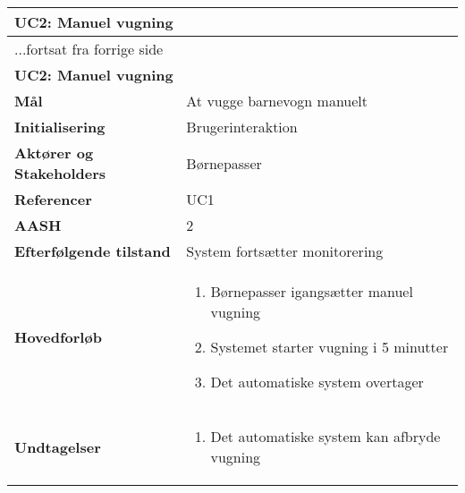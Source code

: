 \begin{center} \centering \label{kravspec:uc2}
	\begin{longtable}{|p{5cm}|p{9cm}|}  %
	\hline
		\multicolumn{2}{|l|}{\textbf{UC2: Manuel vugning}} \\\hline %
		\endfirsthead
		
		\multicolumn{2}{l}{...fortsat fra forrige side} \\ \hline %
		\multicolumn{2}{|l|}{\textbf{UC2: Manuel vugning}} \\\hline %
		\endhead	
		
		\textbf{Mål}							&At vugge barnevogn manuelt		\\\hline
		\textbf{Initialisering}				&Brugerinteraktion		\\\hline
		\textbf{Aktører og Stakeholders}		&Børnepasser		\\\hline 
		\textbf{Referencer}					&UC1		\\\hline
		\textbf{AASH}						&2		\\\hline
		\textbf{Efterfølgende tilstand}		&System fortsætter monitorering		\\\hline
		\textbf{Hovedforløb}					
			&\begin{enumerate}
	
				\item Børnepasser igangsætter manuel vugning
				
				\item \label{kravspec:uc1_vugning}Systemet starter vugning i 5 minutter			
	
				\item Det automatiske system overtager 
				
			\end{enumerate}
		\\\hline
		\textbf{Undtagelser}
			&\begin{enumerate}[label=\ref{kravspec:uc1_vugning}.a]
			
				\item Det automatiske system kan afbryde vugning

			\end{enumerate}
		\\\hline
	\end{longtable} 
\end{center}

